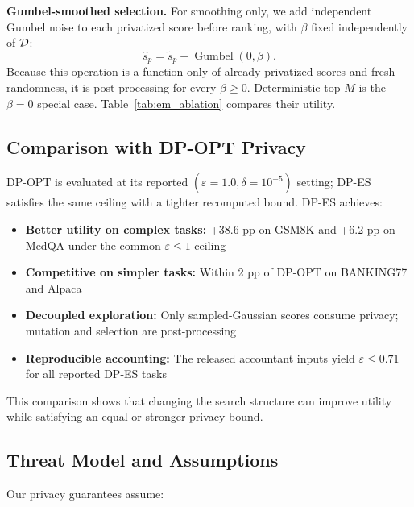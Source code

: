 \noindent\textbf{Gumbel-smoothed selection.}
For smoothing only, we add independent Gumbel noise to each privatized score before ranking, with $\beta$ fixed independently of $\mathcal{D}$:
\begin{equation}
\hat{s}_p = \tilde{s}_p + \operatorname{Gumbel}(0,\beta).
\end{equation}
Because this operation is a function only of already privatized scores and fresh randomness, it is post-processing for every $\beta\geq0$. Deterministic top-$M$ is the $\beta=0$ special case. Table~\ref{tab:em_ablation} compares their utility.

\subsection{Comparison with DP-OPT Privacy}

\noindent DP-OPT is evaluated at its reported $(\varepsilon{=}1.0,\delta{=}10^{-5})$ setting; DP-ES satisfies the same ceiling with a tighter recomputed bound. DP-ES achieves:

\begin{itemize}
    \item \textbf{Better utility on complex tasks:} +38.6 pp on GSM8K and +6.2 pp on MedQA under the common $\varepsilon\leq1$ ceiling
    \item \textbf{Competitive on simpler tasks:} Within 2 pp of DP-OPT on BANKING77 and Alpaca
    \item \textbf{Decoupled exploration:} Only sampled-Gaussian scores consume privacy; mutation and selection are post-processing
    \item \textbf{Reproducible accounting:} The released accountant inputs yield $\varepsilon\leq0.71$ for all reported DP-ES tasks
\end{itemize}

This comparison shows that changing the search structure can improve utility while satisfying an equal or stronger privacy bound.

\subsection{Threat Model and Assumptions}

\noindent Our privacy guarantees assume:

